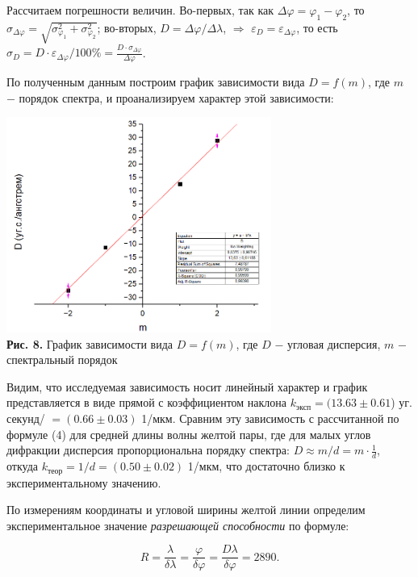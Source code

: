 \documentclass[a4paper,12pt]{article} %
\begin{document}
\hfill \break Рассчитаем погрешности величин. Во-первых, так как $\Delta \varphi = \varphi_{1} - \varphi_{2}$, то $\sigma_{\Delta \varphi} = \sqrt{\sigma_{\varphi_{1}}^2 + \sigma_{\varphi_{2}}^2}$; во-вторых, $D = \Delta \varphi / \Delta \lambda$, $\Rightarrow$ $\varepsilon_{D} = \varepsilon_{\Delta \varphi}$, то есть $\sigma_{D} = D \cdot \varepsilon_{\Delta \varphi}/100 \% = \frac{D \cdot \sigma_{\Delta \varphi}}{\Delta \varphi}$.

\hfill \break По полученным данным построим график зависимости вида $D = f(m)$, где $m$ $-$ порядок спектра, и проанализируем характер этой зависимости:

\begin{center}
\includegraphics[width=0.65\textwidth]{4.4.1_8.png}\\
\textbf{Рис. 8.} График зависимости вида $D = f(m)$, где $D$ $-$ угловая дисперсия, $m$ $-$ спектральный порядок\\
\end{center}

\hfill \break Видим, что исследуемая зависимость носит линейный характер и график представляется в виде прямой с коэффициентом наклона $k_{\text{эксп}} = (13.63 \pm 0.61$) уг. секунд/\text{\AA} $= (0.66 \pm 0.03)$ 1/мкм. Сравним эту зависимость с рассчитанной по формуле (4) для средней длины волны желтой пары, где для малых углов дифракции дисперсия пропорциональна порядку спектра: $D \approx m/d = m \cdot \frac{1}{d}$, откуда $k_{\text{теор}} = 1/d = (0.50 \pm 0.02)$ 1/мкм, что достаточно близко к экспериментальному значению.

\hfill \break По измерениям координаты и угловой ширины желтой линии определим экспериментальное значение \textit{разрешающей способности} по формуле:

$$
R = \frac{\lambda}{\delta \lambda} = \frac{\varphi}{\delta \varphi} = \frac{D\lambda}{\delta \varphi} = 2890.
$$
\end{document}
